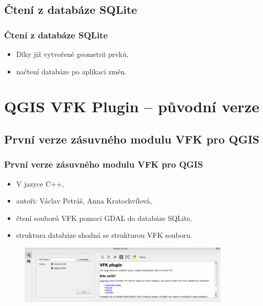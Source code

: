 \documentclass{beamer}
\begin{document}

\subsection{Čtení z databáze SQLite}

\begin{frame}
\frametitle{Čtení z databáze SQLite}

\begin{itemize}
 \item Díky již vytvořené geometrii prvků,
 \item načtení databáze po aplikaci změn.
\end{itemize}

\end{frame}


\section{QGIS VFK Plugin -- původní verze}

\subsection{První verze zásuvného modulu VFK pro QGIS}

\begin{frame}
\frametitle{První verze zásuvného modulu VFK pro QGIS}

\begin{itemize}
 \item V jazyce C++,
 \item autoři: Václav Petráš, Anna Kratochvílová,
 \item čtení souborů VFK pomocí GDAL do databáze SQLite,
 \item struktura databáze shodná se strukturou VFK souboru.
\end{itemize}

\begin{figure}
  \includegraphics[width=0.9\textwidth]{images/vfkPlugin-puvodni.png}
\end{figure}

\end{frame}
\end{document}
